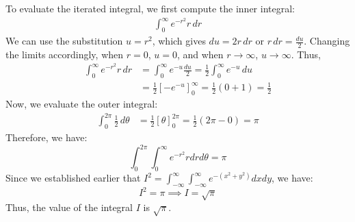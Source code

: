 \documentclass[reqno, 12pt]{amsart}
\begin{document}
\begin{itemize}
\begin{itemize}
        \begin{answerbox}
          To evaluate the iterated integral, we first compute the inner integral:
          \begin{align*}
            \int_0^\infty e^{-r^2} r \, dr
          \end{align*}
          We can use the substitution $u = r^2$, which gives $du = 2r \, dr$ or $r \, dr = \frac{du}{2}$. Changing the limits accordingly, when $r = 0$, $u = 0$, and when $r \to \infty$, $u \to \infty$. Thus,
          \begin{align*}
            \int_0^\infty e^{-r^2} r \, dr &= \int_0^\infty e^{-u} \frac{du}{2} = \frac{1}{2} \int_0^\infty e^{-u} \, du \\
            &= \frac{1}{2} \left[ -e^{-u} \right]_0^\infty = \frac{1}{2} (0 + 1) = \frac{1}{2}
          \end{align*}
          Now, we evaluate the outer integral:
          \begin{align*}
            \int_0^{2\pi} \frac{1}{2} \, d\theta &= \frac{1}{2} \left[ \theta \right]_0^{2\pi} = \frac{1}{2} (2\pi - 0) = \pi
          \end{align*}
          Therefore, we have:
          \[\int_0^{2\pi}\int_0^\infty e^{-r^2}rdrd\theta = \pi\]
          Since we established earlier that $I^2 = \int_{-\infty}^\infty\int_{-\infty}^\infty e^{-(x^2+y^2)}dxdy$, we have:
          \[I^2 = \pi \implies I = \sqrt{\pi}\]
          Thus, the value of the integral $I$ is $\boxed{\sqrt{\pi}}$.
        \end{answerbox}
        \vspace{0.5 in}
    \end{itemize}
\end{itemize}
\end{document}
